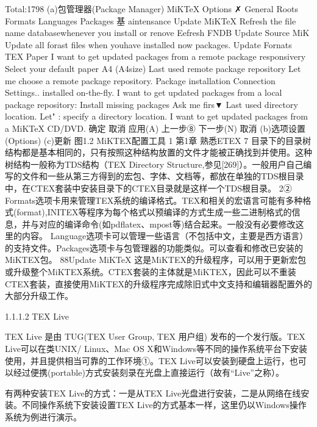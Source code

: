 \documentclass[UTF8]{ctexart}
\begin{document}
Total:1798
(a)包管理器(Package Manager)
MiKTeX Options
✗
General
Roots
Formats
Languages
Packages
基 aintensance
Update MiKTeX
Refresh the file name databasewhenever you install or renove
Eefresh FNDB
Update Source
MiK
Update all forast files when youhave installed now packages.
Update Fornats
TEX
Paper
I want to get updated packages from a remote package responsivery
Select your default paper
A4 (A4size)
Last used remote package repository
Let me choose a remote package repository.
Package installation
Connection Settings..
installed on-the-fly.
I want to get updated packages from a local package repository:
Install missing packages
Ask me firs▼
Last used directory location.
Let" : specify a directory location.
I want to get updated packages from a MiKTeX CD/DVD.
确定
取消
应用(A)
上一步⑧
下一步(N)
取消
(b)选项设置(Options)
(c)更新
图1.2 MiKTEX配置工具
1
第1章	熟悉ETEX	7
目录下的目录树结构都是基本相同的，只有按照这种结构放置的文件才能被正确找到并使用。这种树结构一般称为TDS结构（TEX Directory Structure,参见[269]）。一般用户自己编写的文件和一些从第三方得到的宏包、字体、文档等，都放在单独的TDS根目录中，在CTEX套装中安装目录下的CTEX目录就是这样一个TDS根目录。
2②
Formats选项卡用来管理TEX系统的编译格式。TEX和相关的宏语言可能有多种格式(format),INITEX等程序为每个格式以预编译的方式生成一些二进制格式的信息，并与对应的编译命令(如pdflatex、mpost等)结合起来。一般没有必要修改这里的内容。
Language选项卡可以管理一些语言（不包括中文，主要是西方语言）的支持文件。Packages选项卡与包管理器的功能类似。可以查看和修改已安装的MiKTEX包。
88Update MiKTeX
这是MiKTEX的升级程序，可以用于更新宏包或升级整个MiKTEX系统。CTEX套装的主体就是MiKTEX，因此可以不重装CTEX套装，直接使用MiKTEX的升级程序完成除旧式中文支持和编辑器配置外的大部分升级工作。

1.1.1.2 TEX Live

TEX Live 是由 TUG(TEX User Group, TEX 用户组) 发布的一个发行版。TEX Live可以在类UNIX/ Linux、Mac OS X和Windows等不同的操作系统平台下安装使用，并且提供相当可靠的工作环境①。TEX Live可以安装到硬盘上运行，也可以经过便携(portable)方式安装刻录在光盘上直接运行（故有“Live”之称）。

有两种安装TEX Live的方式：一是从TEX Live光盘进行安装，二是从网络在线安装。不同操作系统下安装设置TEX Live的方式基本一样，这里仍以Windows操作系统为例进行演示。
\end{document}
